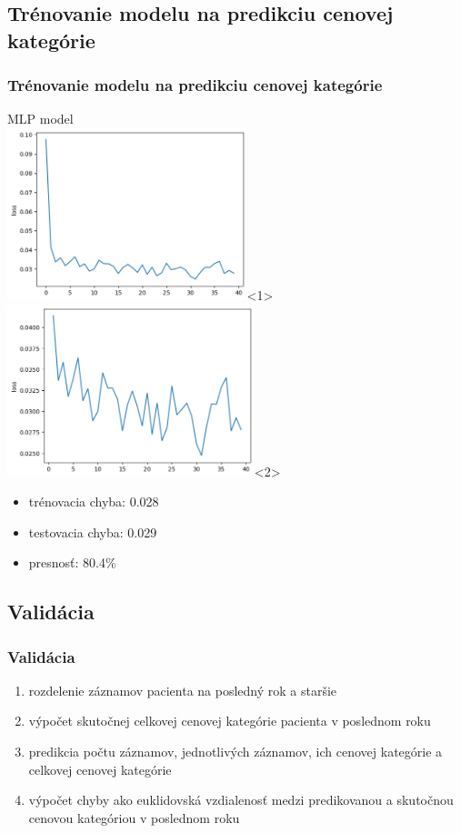\documentclass[slovak]{beamer}
\begin{document}
\subsection{Trénovanie modelu na predikciu cenovej kategórie}

\begin{frame}
	\frametitle{Trénovanie modelu na predikciu cenovej kategórie}
	MLP model \\
	\includegraphics[height=5cm]{images/mlp_train_loss_1.png}<1>
	\includegraphics[height=5cm]{images/mlp_train_loss_2.png}<2>
	\begin{itemize}
		\item<1-> trénovacia chyba: 0.028
		\item<1-> testovacia chyba: 0.029
		\item<1-> presnosť: 80.4\%
	\end{itemize}
\end{frame}

\subsection{Validácia}

\begin{frame}
	\frametitle{Validácia}
	
		\begin{enumerate}
			\item<1> rozdelenie záznamov pacienta na posledný rok a staršie 
			\item<1> výpočet skutočnej celkovej cenovej kategórie pacienta v poslednom roku 
			\item<1> predikcia počtu záznamov, jednotlivých záznamov, ich cenovej kategórie a celkovej cenovej kategórie
			\item<1> výpočet chyby ako euklidovská vzdialenosť medzi predikovanou a skutočnou cenovou kategóriou v poslednom roku 
		\end{enumerate}
\end{frame}
\end{document}
